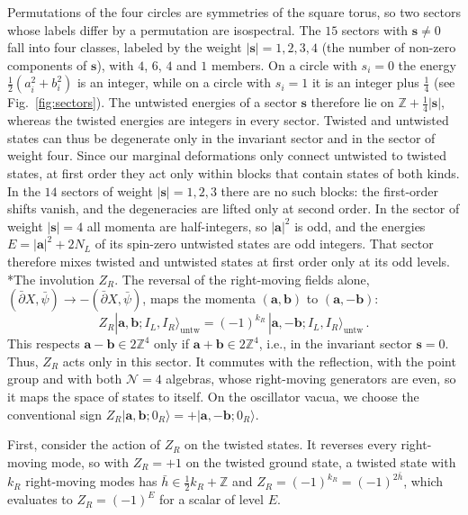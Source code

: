 \documentclass[aps,onecolumn,groupedaddress,nofootinbib,pra]{revtex4-2}
\makeatletter
\renewcommand\paragraph{\@startsection{paragraph}{4}{\parindent}{\z@}{-1em}{\normalfont\normalsize\bfseries}}
\newcommand{\bs}{\mathbf s}
\newcommand{\ba}{\mathbf a}
\newcommand{\bb}{\mathbf b}
\makeatother
\begin{document}
Permutations of the four circles are symmetries of the square torus, so two sectors whose labels differ by a permutation are isospectral. The $15$ sectors with $\bs\neq 0$ fall into four classes, labeled by the weight $|\bs|=1,2,3,4$ (the number of non-zero components of $\bs$), with $4$, $6$, $4$ and $1$ members. On a circle with $s_i=0$ the energy $\frac12(a_i^2+b_i^2)$ is an integer, while on a circle with $s_i=1$ it is an integer plus $\frac14$ (see Fig.~\ref{fig:sectors}). The untwisted energies of a sector $\bs$ therefore lie on $\mathbb Z+\frac14|\bs|$, whereas the twisted energies are integers in every sector. Twisted and untwisted states can thus be degenerate only in the invariant sector and in the sector of weight four. Since our marginal deformations only connect untwisted to twisted states, at first order they act only within blocks that contain states of both kinds. In the $14$ sectors of weight $|\bs|=1,2,3$ there are no such blocks: the first-order shifts vanish, and the degeneracies are lifted only at second order. In the sector of weight $|\bs|=4$ all momenta are half-integers, so $|\ba|^2$ is odd, and the energies $E=|\ba|^2+2N_L$ of its spin-zero untwisted states are odd integers. That sector therefore mixes twisted and untwisted states at first order only at its odd levels.\\

\paragraph*{The involution $Z_R$.}
The reversal of the right-moving fields alone, $(\bar\partial X,\bar\psi)\to-(\bar\partial X,\bar\psi)$, maps the momenta $(\ba,\bb)$ to $(\ba,-\bb)$:
\begin{equation}
 Z_R |\ba,\bb;I_L,I_R\rangle_{\text{untw}} = (-1)^{k_R} \, |\ba,-\bb;I_L,I_R \rangle_{\text{untw}} \,.
\end{equation}
This respects $\ba-\bb\in2\mathbb Z^4$ only if $\ba+\bb\in2\mathbb Z^4$, i.e., in the invariant sector $\bs=0$. Thus, $Z_R$ acts only in this sector. It commutes with the reflection, with the point group and with both $\mathcal N=4$ algebras, whose right-moving generators are even, so it maps the space of states to itself. On the oscillator vacua, we choose the conventional sign $Z_R |\ba,\bb;0_R\rangle = +|\ba,-\bb;0_R\rangle$.

First, consider the action of $Z_R$ on the twisted states. It reverses every right-moving mode, so with $Z_R=+1$ on the twisted ground state, a twisted state with $k_R$ right-moving modes has $\bar h\in\frac{1}{2}k_R+\mathbb Z$ and $Z_R=(-1)^{k_R}=(-1)^{2\bar h}$, which evaluates to $Z_R=(-1)^E$ for a scalar of level $E$.
\end{document}
